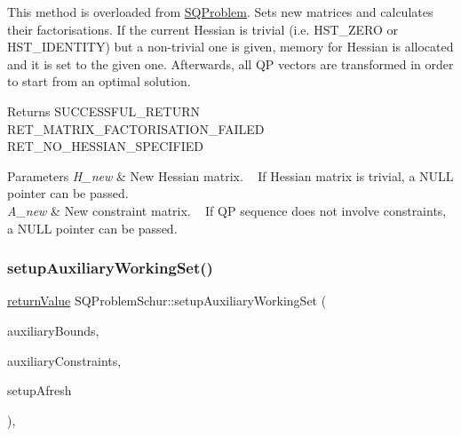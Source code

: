 This method is overloaded from \hyperlink{class_s_q_problem}{S\+Q\+Problem}. Sets new matrices and calculates their factorisations. If the current Hessian is trivial (i.\+e. H\+S\+T\+\_\+\+Z\+E\+RO or H\+S\+T\+\_\+\+I\+D\+E\+N\+T\+I\+TY) but a non-\/trivial one is given, memory for Hessian is allocated and it is set to the given one. Afterwards, all QP vectors are transformed in order to start from an optimal solution. \begin{DoxyReturn}{Returns}
S\+U\+C\+C\+E\+S\+S\+F\+U\+L\+\_\+\+R\+E\+T\+U\+RN ~\newline
 R\+E\+T\+\_\+\+M\+A\+T\+R\+I\+X\+\_\+\+F\+A\+C\+T\+O\+R\+I\+S\+A\+T\+I\+O\+N\+\_\+\+F\+A\+I\+L\+ED ~\newline
 R\+E\+T\+\_\+\+N\+O\+\_\+\+H\+E\+S\+S\+I\+A\+N\+\_\+\+S\+P\+E\+C\+I\+F\+I\+ED 
\end{DoxyReturn}

\begin{DoxyParams}{Parameters}
{\em H\+\_\+new} & New Hessian matrix. ~\newline
 If Hessian matrix is trivial, a N\+U\+LL pointer can be passed. \\
\hline
{\em A\+\_\+new} & New constraint matrix. ~\newline
 If QP sequence does not involve constraints, a N\+U\+LL pointer can be passed. \\
\hline
\end{DoxyParams}
\mbox{\label{class_s_q_problem_schur_ade016d6f90fd2761ca573d3efd9b575e}} 
\subsubsection{\texorpdfstring{setup\+Auxiliary\+Working\+Set()}{setupAuxiliaryWorkingSet()}}
{\footnotesize\ttfamily \hyperlink{_message_handling_8hpp_a81d556f613bfbabd0b1f9488c0fa865e}{return\+Value} S\+Q\+Problem\+Schur\+::setup\+Auxiliary\+Working\+Set (\begin{DoxyParamCaption}\item[{const \hyperlink{class_bounds}{Bounds} $\ast$const}]{auxiliary\+Bounds,  }\item[{const \hyperlink{class_constraints}{Constraints} $\ast$const}]{auxiliary\+Constraints,  }\item[{\hyperlink{_types_8hpp_a20f82124c82b6f5686a7fce454ef9089}{Boolean\+Type}}]{setup\+Afresh }\end{DoxyParamCaption})\hspace{0.3cm}{\ttfamily [protected]}, {\ttfamily [virtual]}}

